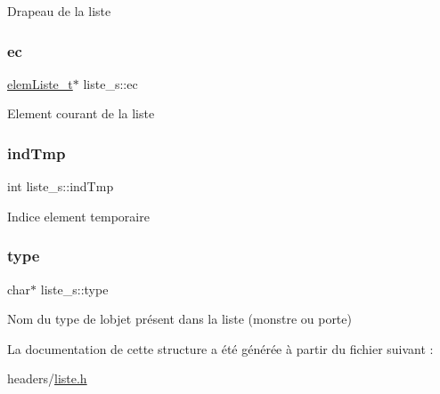 Drapeau de la liste \mbox{\label{structliste__s_a66e567f3f41e8e9a451ba207bbd93a3a}} 
\subsubsection{\texorpdfstring{ec}{ec}}
{\footnotesize\ttfamily \hyperlink{structelem_liste__s}{elem\+Liste\+\_\+t}$\ast$ liste\+\_\+s\+::ec}

Element courant de la liste \mbox{\label{structliste__s_a11df2a5f4a74043f0435b76ccdc24ba5}} 
\subsubsection{\texorpdfstring{ind\+Tmp}{indTmp}}
{\footnotesize\ttfamily int liste\+\_\+s\+::ind\+Tmp}

Indice element temporaire \mbox{\label{structliste__s_a85b56be0222a73dfde956aae220b6331}} 
\subsubsection{\texorpdfstring{type}{type}}
{\footnotesize\ttfamily char$\ast$ liste\+\_\+s\+::type}

Nom du type de l\textquotesingle{}objet présent dans la liste (monstre ou porte) 

La documentation de cette structure a été générée à partir du fichier suivant \+:\begin{DoxyCompactItemize}
\item 
headers/\hyperlink{liste_8h}{liste.\+h}\end{DoxyCompactItemize}
